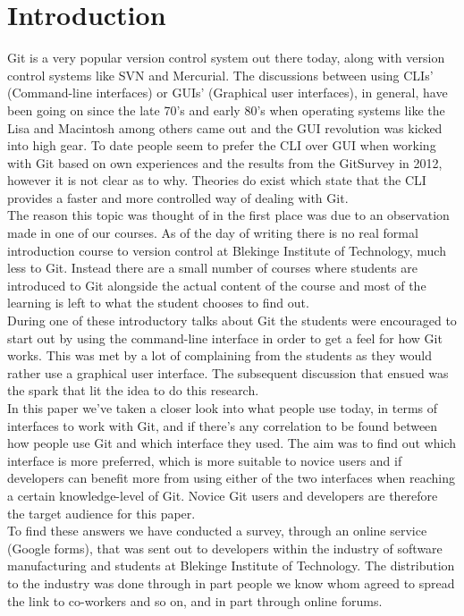 \documentclass[a4paper,oneside]{bth} %
\begin{document}
		\chapter{Introduction}
		Git is a very popular version control system out there today, along with version control systems like SVN and Mercurial. The discussions between using CLIs' (Command-line interfaces) or GUIs' (Graphical user interfaces), in general, have been going on since the late 70's and early 80's when operating systems like the Lisa and Macintosh among others came out \cite{HistoryOfGUIWiki} and the GUI revolution was kicked into high gear.
		To date people seem to prefer the CLI over GUI when working with Git based on own experiences and the results from the GitSurvey in 2012\cite{GitUserSurvey}, however it is not clear as to why.
		Theories do exist which state that the CLI provides a faster and more controlled way of dealing with Git. \cite{GitUserSurvey}\cite{GitInClassroom}
		\\
		The reason this topic was thought of in the first place was due to an observation made in one of our courses. As of the day of writing there is no real formal introduction course to version control at Blekinge Institute of Technology, much less to Git. Instead there are a small number of courses where students are introduced to Git alongside the actual content of the course and most of the learning is left to what the student chooses to find out.\\
		During one of these introductory talks about Git the students were encouraged to start out by using the command-line interface in order to get a feel for how Git works. This was met by a lot of complaining from the students as they would rather use a graphical user interface. The subsequent discussion that ensued was the spark that lit the idea to do this research.
		\\
		In this paper we've taken a closer look into what people use today, in terms of interfaces to work with Git, and if there's any correlation to be found between how people use Git and which interface they used.
		The aim was to find out which interface is more preferred, which is more suitable to novice users and if developers can benefit more from using either of the two interfaces when reaching a certain knowledge-level of Git. Novice Git users and developers are therefore the target audience for this paper.\\
		To find these answers we have conducted a survey, through an online service (Google forms), that was sent out to developers within the industry of software manufacturing and students at Blekinge Institute of Technology. The distribution to the industry was done through in part people we know whom agreed to spread the link to co-workers and so on, and in part through online forums. \\
\end{document}
